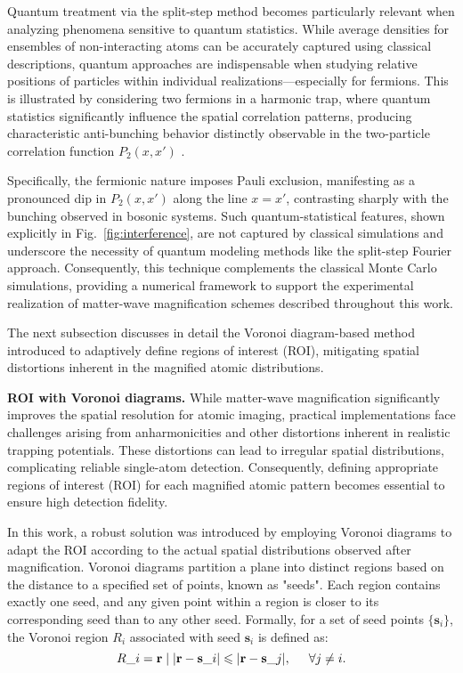 Quantum treatment via the split-step method becomes particularly relevant when analyzing phenomena sensitive to quantum statistics. While average densities for ensembles of non-interacting atoms can be accurately captured using classical descriptions, quantum approaches are indispensable when studying relative positions of particles within individual realizations—especially for fermions. This is illustrated by considering two fermions in a harmonic trap, where quantum statistics significantly influence the spatial correlation patterns, producing characteristic anti-bunching behavior distinctly observable in the two-particle correlation function $P_2(x,x')$ \cite{bergschneider_experimental_2019}.

Specifically, the fermionic nature imposes Pauli exclusion, manifesting as a pronounced dip in $P_2(x,x')$ along the line $x=x'$, contrasting sharply with the bunching observed in bosonic systems. Such quantum-statistical features, shown explicitly in Fig.~\ref{fig:interference}, are not captured by classical simulations and underscore the necessity of quantum modeling methods like the split-step Fourier approach. Consequently, this technique complements the classical Monte Carlo simulations, providing a numerical framework to support the experimental realization of matter-wave magnification schemes described throughout this work.

The next subsection discusses in detail the Voronoi diagram-based method introduced to adaptively define regions of interest (ROI), mitigating spatial distortions inherent in the magnified atomic distributions.


\textbf{ROI with Voronoi diagrams.}
While matter-wave magnification significantly improves the spatial resolution for atomic imaging, practical implementations face challenges arising from anharmonicities and other distortions inherent in realistic trapping potentials. These distortions can lead to irregular spatial distributions, complicating reliable single-atom detection. Consequently, defining appropriate regions of interest (ROI) for each magnified atomic pattern becomes essential to ensure high detection fidelity.

In this work, a robust solution was introduced by employing Voronoi diagrams to adapt the ROI according to the actual spatial distributions observed after magnification. Voronoi diagrams partition a plane into distinct regions based on the distance to a specified set of points, known as "seeds". Each region contains exactly one seed, and any given point within a region is closer to its corresponding seed than to any other seed. Formally, for a set of seed points $\{\mathbf{s}_i\}$, the Voronoi region $R_i$ associated with seed $\mathbf{s}_i$ is defined as:
\begin{equation}
R\_i = {\mathbf{r} \mid |\mathbf{r}-\mathbf{s}\_i| \leq |\mathbf{r}-\mathbf{s}\_j|, \hspace{5 mm} \forall j \neq i}.
\end{equation}

